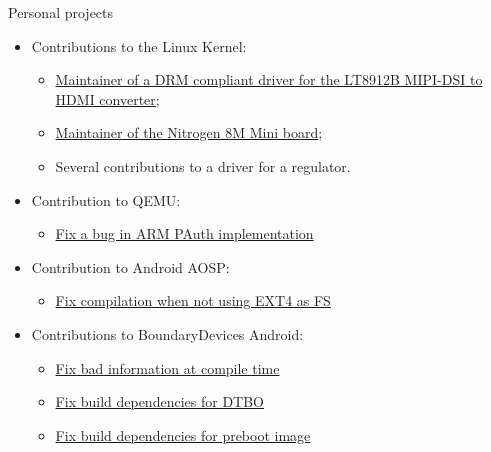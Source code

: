\documentclass[a4paper, 10pt]{article}
\begin{document}
\begin{unbreakableSection} {Personal projects}
    \begin{projects}
	\begin{itemize}[parsep=0cm,itemsep=0cm,topsep=0cm]
		\item Contributions to the Linux Kernel:
		\begin{itemize}[parsep=0cm,itemsep=0cm,topsep=0cm]
			\item \href{https://git.kernel.org/pub/scm/linux/kernel/git/next/linux-next.git/commit/drivers/gpu/drm/bridge/lontium-lt8912b.c}{Maintainer of a DRM compliant driver for the LT8912B MIPI-DSI to HDMI converter};
			\item \href{https://git.kernel.org/pub/scm/linux/kernel/git/next/linux-next.git/tree/arch/arm64/boot/dts/freescale/imx8mm-nitrogen-r2.dts}{Maintainer of the Nitrogen 8M Mini board};
			\item Several contributions to a driver for a regulator.
		\end{itemize}
		\item Contribution to QEMU:
			\begin{itemize}[parsep=0cm,itemsep=0cm,topsep=0cm]
				\item \href{https://git.qemu.org/?p=qemu.git;a=commit;h=de0b1bae6461f67243282555475f88b2384a1eb9}{Fix a bug in ARM PAuth implementation}
			\end{itemize}
		\item Contribution to Android AOSP:
			\begin{itemize}[parsep=0cm,itemsep=0cm,topsep=0cm]
				\item \href{https://android.googlesource.com/platform/bootable/recovery/+/3cd669f\%5E\%21/}{Fix compilation when not using EXT4 as FS}
			\end{itemize}
		\item Contributions to BoundaryDevices Android:
			\begin{itemize}[parsep=0cm,itemsep=0cm,topsep=0cm]
				\item \href{https://github.com/boundarydevices/android_device_boundary/commit/5d4536c4e4a35cdf6aad2fa1572f59d4ee6080ca}{Fix bad information at compile time}
				\item \href{https://github.com/boundarydevices/android_device_boundary/commit/0f9980203a72c30999acde465490d2353d37015d}{Fix build dependencies for DTBO}
				\item \href{https://github.com/boundarydevices/android_device_boundary/commit/2621cd90aaad4d59327a47074963e2b1cfa9c9cc}{Fix build dependencies for preboot image}

\end{itemize}
\end{itemize}
\end{projects}
\end{unbreakableSection}
\end{document}

